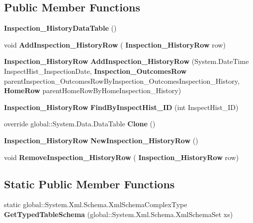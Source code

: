 \subsection*{Public Member Functions}
\begin{DoxyCompactItemize}
\item 
\textbf{ Inspection\+\_\+\+History\+Data\+Table} ()
\item 
void \textbf{ Add\+Inspection\+\_\+\+History\+Row} (\textbf{ Inspection\+\_\+\+History\+Row} row)
\item 
\textbf{ Inspection\+\_\+\+History\+Row} \textbf{ Add\+Inspection\+\_\+\+History\+Row} (System.\+Date\+Time Inspect\+Hist\+\_\+\+Inspection\+Date, \textbf{ Inspection\+\_\+\+Outcomes\+Row} parent\+Inspection\+\_\+\+Outcomes\+Row\+By\+Inspection\+\_\+\+Outcomes\+Inspection\+\_\+\+History, \textbf{ Home\+Row} parent\+Home\+Row\+By\+Home\+Inspection\+\_\+\+History)
\item 
\textbf{ Inspection\+\_\+\+History\+Row} \textbf{ Find\+By\+Inspect\+Hist\+\_\+\+ID} (int Inspect\+Hist\+\_\+\+ID)
\item 
override global\+::\+System.\+Data.\+Data\+Table \textbf{ Clone} ()
\item 
\textbf{ Inspection\+\_\+\+History\+Row} \textbf{ New\+Inspection\+\_\+\+History\+Row} ()
\item 
void \textbf{ Remove\+Inspection\+\_\+\+History\+Row} (\textbf{ Inspection\+\_\+\+History\+Row} row)
\end{DoxyCompactItemize}
\subsection*{Static Public Member Functions}
\begin{DoxyCompactItemize}
\item 
static global\+::\+System.\+Xml.\+Schema.\+Xml\+Schema\+Complex\+Type \textbf{ Get\+Typed\+Table\+Schema} (global\+::\+System.\+Xml.\+Schema.\+Xml\+Schema\+Set xs)
\end{DoxyCompactItemize}

